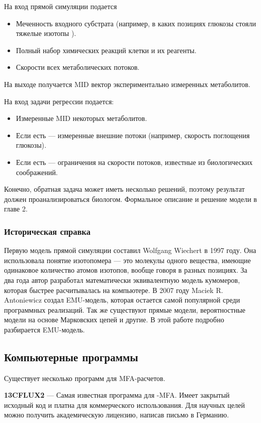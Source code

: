 \documentclass[a4paper, 12pt, left=30mm, right=15mm, top=20mm, bottom=20mm]{report}
\begin{document}
На вход прямой симуляции подается 
\begin{itemize}
	\item Меченность входного субстрата (например, в каких позициях глюкозы стояли тяжелые изотопы ).
	\item Полный набор химических реакций клетки и их реагенты.
	\item Скорости всех метаболических потоков.
\end{itemize}
На выходе получается MID вектор экспериментально измеренных метаболитов. 

На вход задачи регрессии подается:
\begin{itemize}
	\item Измеренные MID некоторых метаболитов.
	\item Если есть --- измеренные внешние потоки (например, скорость поглощения глюкозы).
	\item Если есть --- ограничения на скорости потоков, известные из биологических соображений.
\end{itemize} 
Конечно, обратная задача может иметь несколько решений, поэтому результат должен проанализироваться биологом. Формальное описание и решение модели в главе 2.

\subsubsection{Историческая справка}
Первую модель прямой симуляции составил 	
Wolfgang Wiechert\cite{Wiechert_1997_1, Wiechert_1997_2} в 1997 году. Она использовала понятие изотопомера --- это молекулы одного вещества, имеющие одинаковое количество атомов изотопов, вообще говоря в разных позициях. За два года автор разработал математически эквивалентную модель кумомеров\cite{Wiechert_1999_3, Wiechert_1999_4}, которая быстрее расчитывалась на компьютере. В 2007 году Maciek R. Antoniewicz создал EMU-модель\cite{EMU_2007}, которая остается самой популярной среди программных реализаций. Так же существуют прямые модели\cite{Direct_MFA}, вероятностные модели на основе Марковских цепей\cite{Markov_chain_MFA} и другие\cite{Fluxomer_MFA}. В этой работе подробно разбирается EMU-модель.

\clearpage
\subsection{Компьютерные программы}
Существует несколько программ для MFA-расчетов.  

\textbf{13CFLUX2} --- Самая известная программа для -MFA. Имеет закрытый исходный код и платна для коммерческого использования. Для научных целей можно получить академическую лицензию, написав письмо в Германию\cite{13CFLUX2}.
\end{document}
